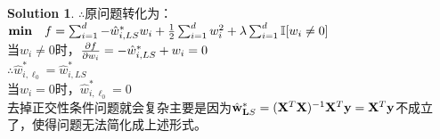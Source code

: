 \documentclass[a4paper,UTF8]{article}
\numberwithin{equation}{section}
\theoremstyle{definition}
\newtheorem*{solution}{Solution}
\begin{document}
\begin{solution}
$\therefore$原问题转化为：\\
$\textbf{min} \quad \mathbf{\mathnormal{f}}=\sum_{i=1}^d -\hat{w}^*_{i,LS} w_i + \frac{1}{2}\sum_{i=1}^d w_i^2 + \lambda \sum_{i=1}^d \mathbb{I}[w_i \neq 0]$\\
当$w_i \neq 0$时，$\frac{\partial \mathbf{\mathnormal{f}}}{\partial w_i} = -\hat{w}^*_{i,LS} + w_i = 0$\\
$\therefore \hat{w}_{i,\ell_0}^* = \hat{w}^*_{i,LS}$\\
当$w_i=0$时，$\hat{w}_{i,\ell_0}^* = 0$\\
去掉正交性条件问题就会复杂主要是因为$\hat{\mathbf w}^*_{\textbf LS} = (\mathbf{X}^T\mathbf X)^{-1}\mathbf{X}^T\mathbf y = \mathbf{X}^T\mathbf y$不成立了，使得问题无法简化成上述形式。
\end{solution}
\end{document}
